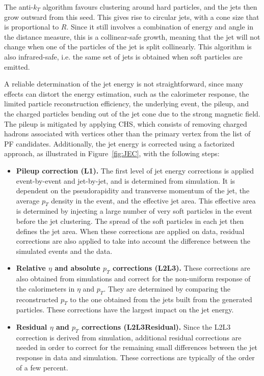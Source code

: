 The anti-$k_T$ algorithm favours clustering around hard particles, and the jets then grow outward from this seed. This gives rise to circular jets, with a cone size that is proportional to $R$. Since it still involves a combination of energy and angle in the distance measure, this is a collinear-safe growth, meaning that the jet will not change when one of the particles of the jet is split collinearly. This algorithm is also infrared-safe, i.e. the same set of jets is obtained when soft particles are emitted.

A reliable determination of the jet energy is not straightforward, since many effects can distort the energy estimation, such as the calorimeter response, the limited particle reconstruction efficiency, the underlying event, the pileup, and the charged particles bending out of the jet cone due to the strong magnetic field. The pileup is mitigated by applying \ac{CHS}, which consists of removing charged hadrons associated with vertices other than the primary vertex from the list of \ac{PF} candidates. Additionally, the jet energy is corrected using a factorized approach, as illustrated in Figure~\ref{fig:JEC}, with the following steps:
\begin{itemize}
 \item \textbf{Pileup correction (L1).} The first level of jet energy corrections is applied event-by-event and jet-by-jet, and is determined from simulation. It is dependent on the pseudorapidity and transverse momentum of the jet, the average $p_T$ density in the event, and the effective jet area. This effective area is determined by injecting a large number of very soft particles in the event before the jet clustering. The spread of the soft particles in each jet then defines the jet area. When these corrections are applied on data, residual corrections are also applied to take into account the difference between the simulated events and the data.
 
 \item \textbf{Relative $\eta$ and absolute $p_T$ corrections (L2L3).} These corrections are also obtained from simulations and correct for the non-uniform response of the calorimeters in $\eta$ and $p_T$. They are determined by comparing the reconstructed $p_T$ to the one obtained from the jets built from the generated particles. These corrections have the largest impact on the jet energy.
 
 \item \textbf{Residual $\eta$ and $p_T$ corrections (L2L3Residual).} Since the L2L3 correction is derived from simulation, additional residual corrections are needed in order to correct for the remaining small differences between the jet response in data and simulation. These corrections are typically of the order of a few percent.
\end{itemize}

